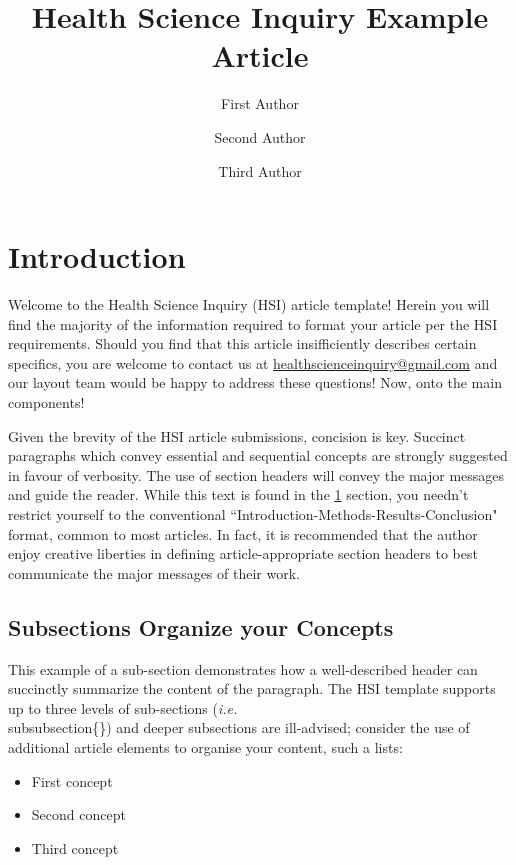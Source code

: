 \documentclass[blue]{HSIarticle}
\title{Health Science Inquiry Example Article}
\author[1,2]{First Author}
\author[1]{Second Author}
\author[2]{Third Author}
\affil[1]{Department of Departmental Studies, \LaTeX\ University}
\affil[2]{Department of Article Templates, University of Example Documents}
\begin{document}
\maketitle %


\section{Introduction}\label{intro}

Welcome to the Health Science Inquiry (HSI) article template! Herein you will find the majority of the information required to format your article per the HSI requirements. Should you find that this article insifficiently describes certain specifics, you are welcome to contact us at \href{mailto:healthscienceinquiry@gmail.com}{healthscienceinquiry@gmail.com} and our layout team would be happy to address these questions! Now, onto the main components!

Given the brevity of the HSI article submissions, concision is key. Succinct paragraphs which convey essential and sequential concepts are strongly suggested in favour of verbosity. The use of section headers will convey the major messages and guide the reader. While this text is found in the \ref{intro} section, you needn't restrict yourself to the conventional ``Introduction-Methods-Results-Conclusion" format, common to most articles. In fact, it is recommended that the author enjoy creative liberties in defining article-appropriate section headers to best communicate the major messages of their work.
\subsection{Subsections Organize your Concepts}
This example of a sub-section demonstrates how a well-described header can succinctly summarize the content of the paragraph. The HSI template supports up to three levels of sub-sections (\textit{i.e.} \\subsubsection\{\}) and deeper subsections are ill-advised; consider the use of additional article elements to organise your content, such a lists:
\begin{itemize}
    \item First concept
    \item Second concept
    \item Third concept
\end{itemize}
\end{document}
